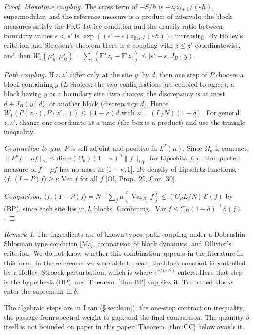 \documentclass[11pt,a4paper]{article}
\theoremstyle{definition}
\theoremstyle{remark}
\newtheorem{remark}[theorem]{Remark}
\newcommand{\E}{\mathbb{E}}
\newcommand{\Var}{\operatorname{Var}}
\newcommand{\cE}{\mathcal{E}}
\begin{document}
\begin{proof}
\emph{Monotone coupling.} The cross term of $-S/\hbar$ is $+z_iz_{i+1}/(\varepsilon\hbar)$, supermodular, and the reference measure is a product of intervals; the block measures satisfy the FKG lattice condition and the density ratio between boundary values $s<s'$ is $\exp((s'-s)z_{\mathrm{first}}/(\varepsilon\hbar))$, increasing. By Holley's criterion and Strassen's theorem there is a coupling with $z\le z'$ coordinatewise, and then $W_1(\mu_B^{s},\mu_B^{s'})=\sum_i(\E^{s'}z_i-\E^{s}z_i)\le|s'-s|\,J_B(y)$.

\emph{Path coupling.} If $z,z'$ differ only at the site $y$, by $d$, then one step of $P$ chooses a block containing $y$ ($L$ choices; the two configurations are coupled to agree), a block having $y$ as a boundary site (two choices; the discrepancy is at most $d+J_B(y)d$), or another block (discrepancy $d$). Hence $W_1(P(z,\cdot),P(z',\cdot))\le(1-\kappa)d$ with $\kappa=(L/N)(1-\delta)$. For general $z,z'$, change one coordinate at a time (the box is a product) and use the triangle inequality.

\emph{Contraction to gap.} $P$ is self-adjoint and positive in $L^2(\mu)$. Since $\Omega_k$ is compact, $\|P^nf-\mu f\|_2\le\mathrm{diam}(\Omega_k)(1-\kappa)^n\|f\|_{\mathrm{Lip}}$ for Lipschitz $f$, so the spectral measure of $f-\mu f$ has no mass in $(1-\kappa,1]$. By density of Lipschitz functions, $\langle f,(I-P)f\rangle\ge\kappa\Var f$ for all $f$ [Ol, Prop.~29, Cor.~30].

\emph{Comparison.} $\langle f,(I-P)f\rangle=N^{-1}\sum_j\mu(\Var_{B_j}f)\le(C_BL/N)\,\cE(f)$ by (BP), since each site lies in $L$ blocks. Combining, $\Var f\le C_B(1-\delta)^{-1}\cE(f)$.
\end{proof}

\begin{remark}
The ingredients are of known types: path coupling under a Dobrushin--Shlosman type condition [Ma], comparison of block dynamics, and Ollivier's criterion. We do not know whether this combination appears in the literature in this form. In the references we were able to read, the block constant is controlled by a Holley--Stroock perturbation, which is where $e^{c/(\varepsilon\hbar)}$ enters. Here that step is the hypothesis (BP), and Theorem~\ref{thm:BP} supplies it. Truncated blocks enter the supremum in $\delta$.
\end{remark}

The algebraic steps are in Lean (\S\ref{sec:lean}): the one-step contraction inequality, the passage from spectral weight to gap, and the final comparison. The quantity $\delta$ itself is not bounded on paper in this paper; Theorem~\ref{thm:CC} below avoids it.
\end{document}
